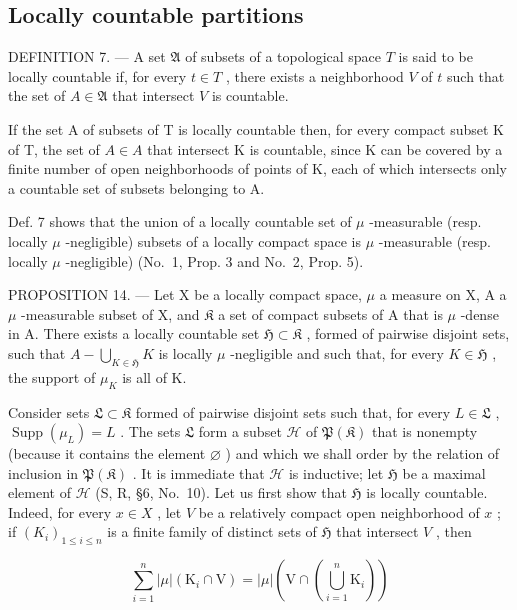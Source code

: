 \subsection{Locally countable partitions}

DEFINITION 7. --- A set \(\mathfrak{A}\) of subsets of a topological space \(T\) is said to be locally countable if, for every \(t \in T\) , there exists a neighborhood \(V\) of \(t\) such that the set of \(A \in \mathfrak{A}\) that intersect \(V\) is countable.

If the set A of subsets of T is locally countable then, for every compact subset K of T, the set of \(A \in A\) that intersect K is countable, since K can be covered by a finite number of open neighborhoods of points of K, each of which intersects only a countable set of subsets belonging to A.

Def. 7 shows that the union of a locally countable set of \(\mu\) -measurable (resp. locally \(\mu\) -negligible) subsets of a locally compact space is \(\mu\) -measurable (resp. locally \(\mu\) -negligible) (No.~1, Prop. 3 and No.~2, Prop. 5).

PROPOSITION 14. --- Let X be a locally compact space, \(\mu\) a measure on X, A a \(\mu\) -measurable subset of X, and \(\mathfrak{K}\) a set of compact subsets of A that is \(\mu\) -dense in A. There exists a locally countable set \(\mathfrak{H} \subset \mathfrak{K}\) , formed of pairwise disjoint sets, such that \(A - \bigcup_{K \in \mathfrak{H}} K\) is locally \(\mu\) -negligible and such that, for every \(K \in \mathfrak{H}\) , the support of \(\mu_K\) is all of K.

Consider sets \(\mathfrak{L} \subset \mathfrak{K}\) formed of pairwise disjoint sets such that, for every \(L \in \mathfrak{L}\) , \(\operatorname{Supp}(\mu_L) = L\) . The sets \(\mathfrak{L}\) form a subset \(\mathscr{H}\) of \(\mathfrak{P}(\mathfrak{K})\) that is nonempty (because it contains the element \(\varnothing\) ) and which we shall order by the relation of inclusion in \(\mathfrak{P}(\mathfrak{K})\) . It is immediate that \(\mathscr{H}\) is inductive; let \(\mathfrak{H}\) be a maximal element of \(\mathscr{H}\) (S, R, §6, No.~10). Let us first show that \(\mathfrak{H}\) is locally countable. Indeed, for every \(x \in X\) , let \(V\) be a relatively compact open neighborhood of \(x\) ; if \((K_i)_{1 \leqslant i \leqslant n}\) is a finite family of distinct sets of \(\mathfrak{H}\) that intersect \(V\) , then

\[
\sum_ {i = 1} ^ {n} | \mu | \left(\mathrm{K} _ {i} \cap \mathrm{V}\right) = | \mu | \left(\mathrm{V} \cap \left(\bigcup_ {i = 1} ^ {n} \mathrm{K} _ {i}\right)\right)
\]

